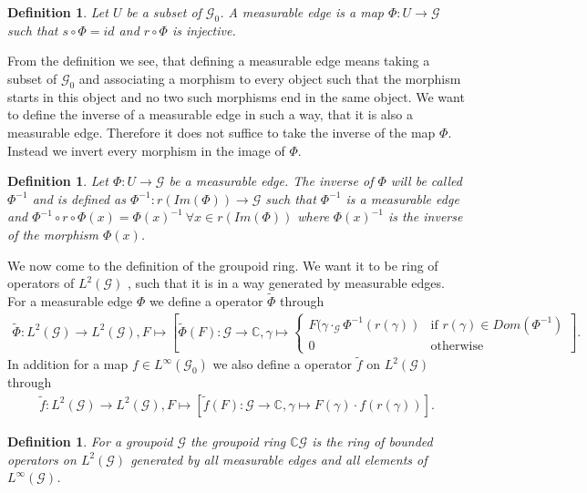 \documentclass[12pt,a4paper]{scrartcl}
\newtheorem{Definition}[Theorem]{Definition}
\numberwithin{equation}{section}
\newcommand{\C}{\mathbb{C}} %
\newcommand{\2}{\mathbb{Z} / 2 \mathbb{Z}}
\newcommand{\G}{\mathcal{G}}
\newcommand{\1}{\bar{1}}
\newcommand{\0}{\bar{0}}
\begin{document}
\begin{Definition}
	Let $U$ be a subset of $\G_0$. A measurable edge is a map $\Phi:U \to \G$ such that $s \circ \Phi = id$ and $r \circ \Phi$ is injective.
\end{Definition}
From the definition we see, that defining a measurable edge means taking a subset of $\G_0$ and associating a morphism to every object such that the morphism starts in this object and no two such morphisms end in the same object. We want to define the inverse of a measurable edge in such a way, that it is also a measurable edge. Therefore it does not suffice to take the inverse of the map $\Phi$. Instead we invert every morphism in the image of $\Phi$.
\begin{Definition}
	Let $\Phi: U \to \G$ be a measurable edge. The inverse of $\Phi$ will be called $\Phi^{-1}$ and is defined as $\Phi^{-1}:r(Im(\Phi)) \to \G$ such that $\Phi^{-1}$ is a measurable edge and $\Phi^{-1} \circ r \circ \Phi (x) = \Phi (x)^{-1} \ \forall x \in r(Im(\Phi))$ where $\Phi (x)^{-1}$ is the inverse of the morphism $\Phi (x)$.
\end{Definition}
We now come to the definition of the groupoid ring. We want it to be ring of operators of $L^2(\G)$ , such that it is in a way generated by measurable edges. For a measurable edge $\Phi$ we define a operator $\tilde \Phi$ through
\begin{align*}
	\tilde \Phi: L^2(\G) \to L^2(\G), F \mapsto \left[ \tilde \Phi (F): \G \to \C, \gamma \mapsto \begin{cases}
	F(\gamma \cdot_{\G} \Phi^{-1}(r(\gamma)) & \text{if } r(\gamma) \in Dom(\Phi^{-1}) \\
	0 & \text{otherwise}
	\end{cases} \right] .
\end{align*}
In addition for a map $f \in L^\infty (\G_0)$ we also define a operator $\tilde f$ on $L^2(\G)$ through
\begin{align*}
	\tilde f: L^2(\G) \to L^2(\G), F \mapsto [\tilde f(F): \G \to \C, \gamma \mapsto F(\gamma) \cdot f(r(\gamma))].
\end{align*}
\begin{Definition}
	For a groupoid $\G$ the groupoid ring $\C\G$ is the ring of bounded operators on $L^2(\G)$ generated by all measurable edges and all elements of $L^\infty(\G)$.
\end{Definition}
\end{document}
